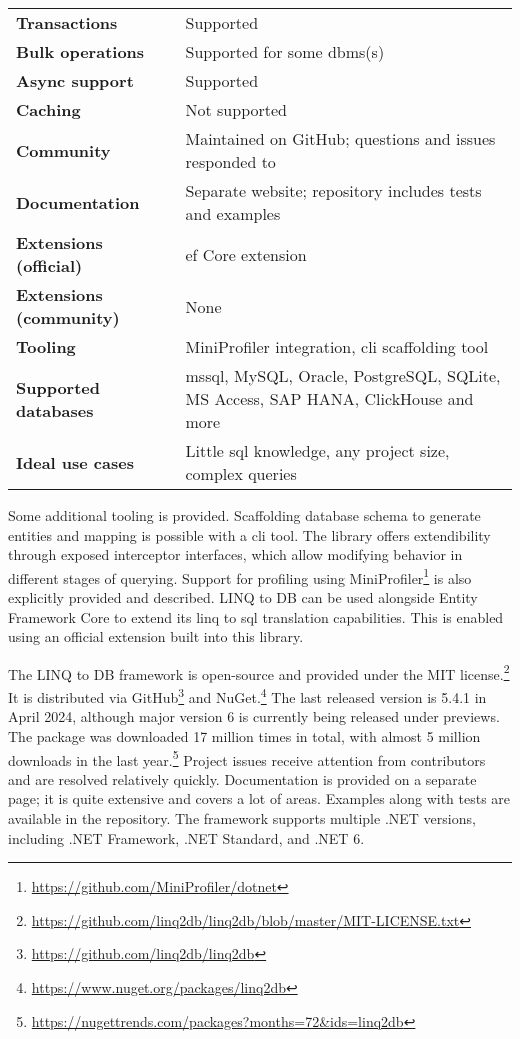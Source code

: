 {\begin{landscape}
\begin{table}[H]
\begin{tabular}{ll}
\textbf{Transactions} & Supported \\
\textbf{Bulk operations} & Supported for some \acrshort{dbms}(s)\\
\textbf{Async support} & Supported \\
\textbf{Caching} & Not supported \\
\textbf{Community} & Maintained on GitHub; questions and issues responded to \\
\textbf{Documentation} & Separate website; repository includes tests and examples\\
\textbf{Extensions (official)} & \acrshort{ef} Core extension \\
\textbf{Extensions (community)} & None \\
\textbf{Tooling} & MiniProfiler integration, \acrshort{cli} scaffolding tool \\
\textbf{Supported databases} & \acrshort{mssql}, MySQL, Oracle, PostgreSQL, SQLite, MS Access, SAP HANA, ClickHouse and more  \\
\textbf{Ideal use cases} & Little \acrshort{sql} knowledge, any project size, complex queries \\
\bottomrule
\end{tabular}
\end{table}
\end{landscape}
}

Some additional tooling is provided. Scaffolding database schema to generate entities and mapping is possible with a \acrshort{cli} tool. The library offers extendibility through exposed interceptor interfaces, which allow modifying behavior in different stages of querying. Support for profiling using MiniProfiler\footnote{\url{https://github.com/MiniProfiler/dotnet}} is also explicitly provided and described.
LINQ to DB can be used alongside Entity Framework Core to extend its \acrshort{linq} to \acrshort{sql} translation capabilities. This is enabled using an official extension built into this library.

The LINQ to DB framework is open-source and provided under the MIT license.\footnote{\url{https://github.com/linq2db/linq2db/blob/master/MIT-LICENSE.txt}} It is distributed via GitHub\footnote{\url{https://github.com/linq2db/linq2db}} and NuGet.\footnote{\url{https://www.nuget.org/packages/linq2db}} The last released version is 5.4.1 in April 2024, although major version 6 is currently being released under previews. The package was downloaded 17 million times in total, with almost 5 million downloads in the last year.\footnote{\url{https://nugettrends.com/packages?months=72&ids=linq2db}} Project issues receive attention from contributors and are resolved relatively quickly. Documentation is provided on a separate page; it is quite extensive and covers a lot of areas. Examples along with tests are available in the repository. The framework supports multiple .NET versions, including .NET Framework, .NET Standard, and .NET 6.



